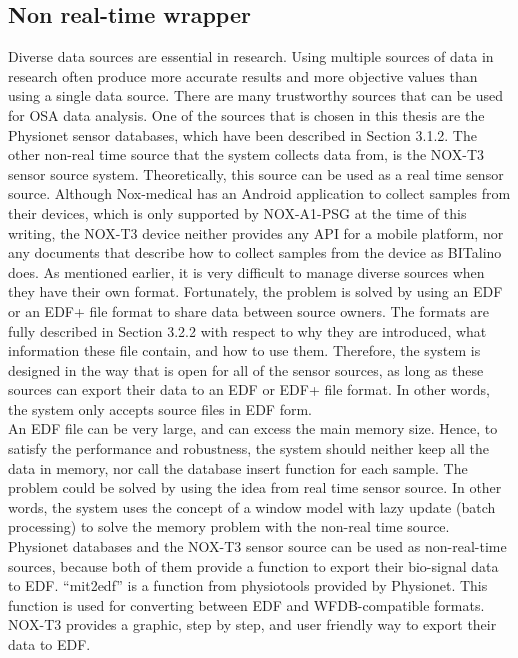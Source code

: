 \subsection{Non real-time wrapper}
Diverse data sources are essential in research. Using multiple sources of data in research often produce more accurate results and more objective values than using a single data source. There are many trustworthy sources that can be used for OSA data analysis. One of the sources that is chosen in this thesis are the Physionet sensor databases, which have been described in Section 3.1.2. The other non-real time source that the system collects data from, is the NOX-T3 sensor source system. Theoretically, this source can be used as a real time sensor source. Although Nox-medical has an Android application to collect samples from their devices, which is only supported by NOX-A1-PSG at the time of this writing, the NOX-T3 device neither provides any API for a mobile platform, nor any documents that describe how to collect samples from the device as BITalino does. As mentioned earlier, it is very difficult to manage diverse sources when they have their own format. Fortunately, the problem is solved by using an EDF or an EDF+ file format to share data between source owners. The formats are fully described in Section 3.2.2 with respect to why they are introduced, what information these file contain, and how to use them. Therefore, the system is designed in the way that is open for all of the sensor sources, as long as these sources can export their data to an EDF or EDF+ file format. In other words, the system only accepts source files in EDF form.\\
An EDF file can be very large, and can excess the main memory size. Hence, to satisfy the performance and robustness, the system should neither keep all the data in memory, nor call the database insert function for each sample. The problem could be solved by using the idea from real time sensor source. In other words, the system uses the concept of a window model with lazy update (batch processing) to solve the memory problem with the non-real time source.\\
Physionet databases and the NOX-T3 sensor source can be used as non-real-time sources, because both of them provide a function to export their bio-signal data to EDF. “mit2edf” is a function from physiotools provided by Physionet. This function is used for converting between EDF and WFDB-compatible formats. NOX-T3 provides a graphic, step by step, and user friendly way to export their data to EDF.
